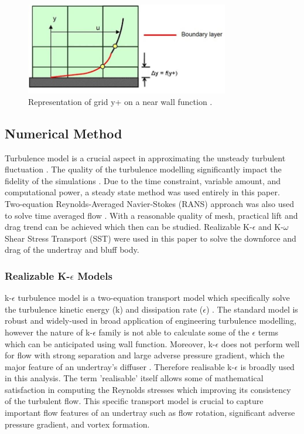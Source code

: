 \begin{figure}[!ht]
    \centering
    \includegraphics[height=4cm]{Figures/inflation_layer.jpg}
    \caption{Representation of grid y+ on a near wall function \cite{Anonymous2013Inflate4Blog}.}
    \label{fig:inflation layer}
\end{figure}


\subsection{Numerical Method}
Turbulence model is a crucial aspect in approximating the unsteady turbulent fluctuation \cite{Cummings2015AppliedAerodynamics}. The quality of the turbulence modelling significantly impact the fidelity of the simulations \cite{Lanfrit2005BestFLUENT}. Due to the time constraint, variable amount, and computational power, a steady state method was used entirely in this paper. Two-equation Reynolds-Averaged Navier-Stokes (RANS) approach was also used to solve time averaged flow \cite{Cummings2015AppliedAerodynamics}. With a reasonable quality of mesh, practical lift and drag trend can be achieved which then can be studied. Realizable K-$\epsilon$ and K-$\omega$ Shear Stress Transport (SST) were used in this paper to solve the downforce and drag of the undertray and bluff body.  

\subsubsection{Realizable K-$\epsilon$  Models}
k-$\epsilon$  turbulence model is a  two-equation transport model which specifically solve the turbulence kinetic energy (k) and dissipation rate ($\epsilon$) \cite{Andersson2011Turbulent-flowModelling}\cite{Mansour1989Near-wallModeling}\cite{Ansys2006ModelingFlows}. The standard model is robust and widely-used in broad application of engineering turbulence modelling, however the nature of  k-$\epsilon$ family is not able to calculate some of the $\epsilon$ terms which can be anticipated using wall function. Moreover, k-$\epsilon$ does not perform well for flow with strong separation and large adverse pressure gradient, which the major feature of an undertray's diffuser \cite{Ansys2006ModelingFlows}.  Therefore realisable k-$\epsilon$ is broadly used in this analysis. The term 'realisable' itself allows some of mathematical satisfaction in computing the Reynolds stresses which improving its consistency of the turbulent flow. This specific transport model is crucial to capture important flow features of an undertray such as flow rotation, significant adverse pressure gradient, and vortex formation.

